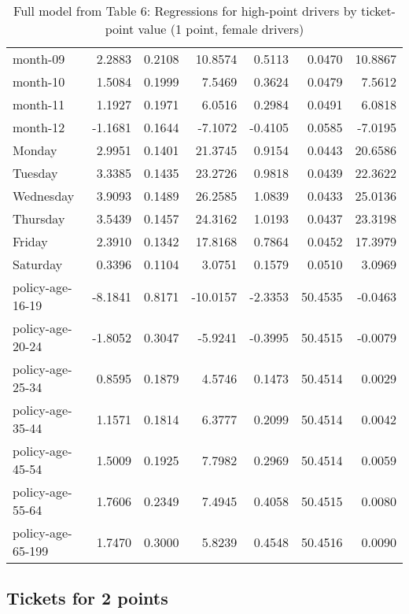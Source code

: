\documentclass[10pt]{article}
\begin{document}
\begin{table}[ht]
\begin{tabular}{lrrrrrr}
  month-09 & 2.2883 & 0.2108 & 10.8574 & 0.5113 & 0.0470 & 10.8867 \\ 
  month-10 & 1.5084 & 0.1999 & 7.5469 & 0.3624 & 0.0479 & 7.5612 \\ 
  month-11 & 1.1927 & 0.1971 & 6.0516 & 0.2984 & 0.0491 & 6.0818 \\ 
  month-12 & -1.1681 & 0.1644 & -7.1072 & -0.4105 & 0.0585 & -7.0195 \\ 
  Monday & 2.9951 & 0.1401 & 21.3745 & 0.9154 & 0.0443 & 20.6586 \\ 
  Tuesday & 3.3385 & 0.1435 & 23.2726 & 0.9818 & 0.0439 & 22.3622 \\ 
  Wednesday & 3.9093 & 0.1489 & 26.2585 & 1.0839 & 0.0433 & 25.0136 \\ 
  Thursday & 3.5439 & 0.1457 & 24.3162 & 1.0193 & 0.0437 & 23.3198 \\ 
  Friday & 2.3910 & 0.1342 & 17.8168 & 0.7864 & 0.0452 & 17.3979 \\ 
  Saturday & 0.3396 & 0.1104 & 3.0751 & 0.1579 & 0.0510 & 3.0969 \\ 
  policy-age-16-19 & -8.1841 & 0.8171 & -10.0157 & -2.3353 & 50.4535 & -0.0463 \\ 
  policy-age-20-24 & -1.8052 & 0.3047 & -5.9241 & -0.3995 & 50.4515 & -0.0079 \\ 
  policy-age-25-34 & 0.8595 & 0.1879 & 4.5746 & 0.1473 & 50.4514 & 0.0029 \\ 
  policy-age-35-44 & 1.1571 & 0.1814 & 6.3777 & 0.2099 & 50.4514 & 0.0042 \\ 
  policy-age-45-54 & 1.5009 & 0.1925 & 7.7982 & 0.2969 & 50.4514 & 0.0059 \\ 
  policy-age-55-64 & 1.7606 & 0.2349 & 7.4945 & 0.4058 & 50.4515 & 0.0080 \\ 
  policy-age-65-199 & 1.7470 & 0.3000 & 5.8239 & 0.4548 & 50.4516 & 0.0090 \\ 
   \hline
\end{tabular}
\caption{Full model from Table 6: Regressions for high-point drivers by ticket-point value (1 point, female drivers)} 
\label{tab_6_1_pts_F}
\end{table}


\clearpage
\pagebreak




\subsection{Tickets for 2 points}
\end{document}
